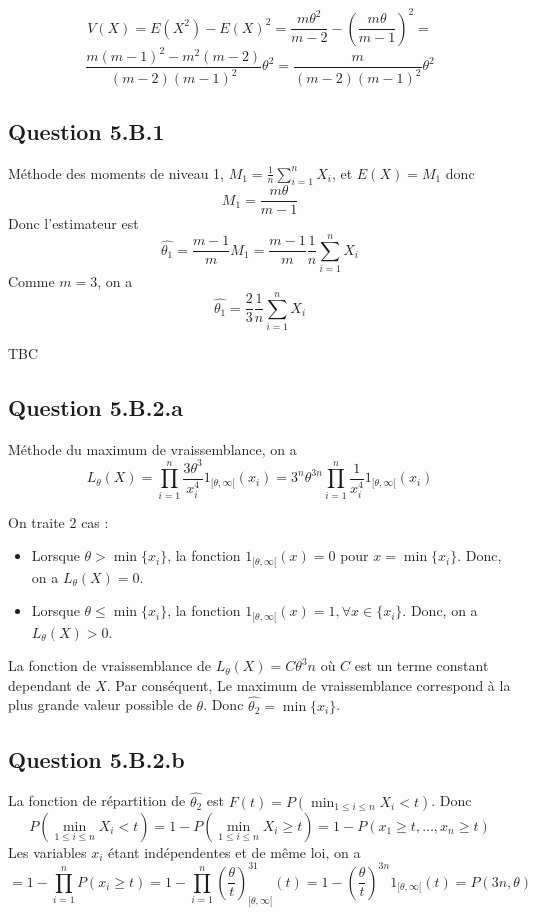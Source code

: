 \documentclass[]{book}
\theoremstyle{definition}
\begin{document}
$$
V(X) = E(X^2) - E(X)^2 = \frac{m \theta^2}{m-2} - \left( \frac{m \theta}{m-1} \right)^2 =
$$
$$
\frac{m(m-1)^2-m^2(m-2)}{(m-2)(m-1)^2}\theta^2 = 
\frac{m}{(m-2)(m-1)^2}\theta^2
$$


\subsection*{Question 5.B.1}

M\'ethode des moments de niveau 1, $M_1 = \frac{1}{n}\sum_{i=1}^{n}{X_i}$, et $E(X) = M_1$ donc 
$$
M_1 = \frac{m \theta}{m-1}
$$
Donc l'estimateur est
$$
\hat{\theta_1} = \frac{m-1}{m}M_1 = \frac{m-1}{m}\frac{1}{n}\sum_{i=1}^{n}{X_i}
$$
Comme $m=3$, on a
$$
\hat{\theta_1} = \frac{2}{3}\frac{1}{n}\sum_{i=1}^{n}{X_i}
$$


TBC

\subsection*{Question 5.B.2.a}
M\'ethode du maximum de vraissemblance, on a 
$$
L_{\theta}(X) = \prod_{i=1}^{n}{\frac{3\theta^3}{x_i^{4}}1_{[\theta, \infty[}(x_i)} = 3^{n}\theta^{3n}\prod_{i=1}^{n}{\frac{1}{x_i^4}1_{[\theta, \infty[}(x_i)}
$$

On traite 2 cas :
\begin{itemize}
\item Lorsque $\theta > \min\{x_i\}$, la fonction $1_{[\theta, \infty[}(x) = 0$ pour $x = \min\{x_i\}$. Donc, on a $L_{\theta}(X) = 0$.   
\item Lorsque $\theta \leq \min\{x_i\}$, la fonction $1_{[\theta, \infty[}(x) = 1, \forall x \in \{x_i\}$. Donc, on a $L_{\theta}(X) > 0$.
\end{itemize}
La fonction de vraissemblance de $L_{\theta}(X) = C \theta^3n$ o\`u $C$ est un terme constant dependant de $X$. Par cons\'equent, Le maximum de vraissemblance correspond \`a la plus grande valeur possible de $\theta$. Donc $\hat{\theta_2} = \min\{x_i\}$.


\subsection*{Question 5.B.2.b}
La fonction de r\'epartition de $\hat{\theta_2}$ est $F(t) = P(\min_{1 \leq i \leq n} X_i <t)$. Donc
$$
P(\min_{1 \leq i \leq n} X_i <t) = 1 - P(\min_{1 \leq i \leq n} X_i \geq t) = 1 - P(x_1 \geq t, \ldots, x_n \geq t) 
$$
Les variables $x_i$ \'etant ind\'ependentes et de m\^eme loi, on a 
$$
= 1 - \prod_{i=1}^{n}{P(x_i \geq t)} 
= 1 - \prod_{i=1}^{n}{\left(\frac{\theta}{t}\right)^31_{[\theta, \infty[}(t)}
= 1 - \left(\frac{\theta}{t}\right)^{3n}1_{[\theta, \infty[}(t) = P(3n, \theta)
$$
\end{document}
